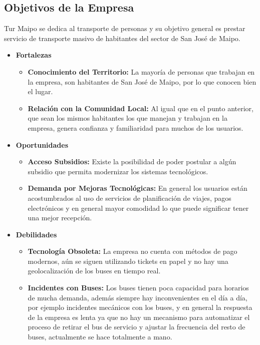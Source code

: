 \documentclass[12pt]{article}
\begin{document}
    \subsection{Objetivos de la Empresa}
    Tur Maipo se dedica al transporte de personas y su objetivo general es prestar servicio de transporte masivo de habitantes del sector de San José de Maipo.
    \begin{itemize}
    \subsection{Análisis FODA}
    \item \textbf{Fortalezas}
    \begin{itemize}
        \item \textbf{Conocimiento del Territorio:} La mayoría de personas que trabajan en la empresa, son habitantes de San José de Maipo, por lo que conocen bien el lugar.
        \item \textbf{Relación con la Comunidad Local:} Al igual que en el punto anterior, que sean los mismos habitantes los que manejan y trabajan en la empresa, genera confianza y familiaridad para muchos de los usuarios.
    \end{itemize}
    \newpage
    \item \textbf{Oportunidades}
    \begin{itemize}
        \item \textbf{Acceso Subsidios: }Existe la posibilidad de poder postular a algún subsidio que permita modernizar los sistemas tecnológicos.
        \item \textbf{Demanda por Mejoras Tecnológicas: }En general los usuarios están acostumbrados al uso de servicios de planificación de viajes, pagos electrónicos y en general mayor comodidad lo que puede significar tener una mejor recepción.
    \end{itemize}
     \item \textbf{Debilidades}
    \begin{itemize}
        \item \textbf{Tecnología Obsoleta: }La empresa no cuenta con métodos de pago modernos, aún se siguen utilizando tickets en papel y no hay una geolocalización de los buses en tiempo real.
        \item \textbf{Incidentes con Buses: }Los buses tienen poca capacidad para horarios de mucha demanda, además siempre hay inconvenientes en el día a día, por ejemplo incidentes mecánicos con los buses, y en general la respuesta de la empresa es lenta ya que no hay un mecanismo para automatizar el proceso de retirar el bus de servicio y ajustar la frecuencia del resto de buses, actualmente se hace totalmente a mano.

\end{itemize}
\end{itemize}
\end{document}
